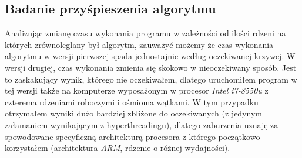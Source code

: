 \documentclass{article}
\begin{document}
    \subsection{Badanie przyśpieszenia algorytmu}
        Analizując zmianę czasu wykonania programu w zależności od ilości rdzeni na których zrównoleglany był algorytm, zauważyć możemy że czas wykonania algorytmu w wersji pierwszej spada jednostajnie według oczekiwanej krzywej. W wersji drugiej, czas  wykonania zmienia się skokowo w nieoczekiwany sposób. Jest to zaskakujący wynik, którego nie oczekiwałem, dlatego uruchomiłem program w tej wersji także na komputerze wyposażonym w procesor \textit{Intel i7-8550u} z czterema rdzeniami roboczymi i ośmioma wątkami. W tym przypadku otrzymałem wyniki dużo bardziej zbliżone do oczekiwanych (z jedynym załamaniem wynikającym z hyperthreadingu), dlatego zaburzenia uznaję za spowodowane specyficzną architekturą procesora z którego początkowo korzystałem (architektura \textit{ARM}, rdzenie o różnej wydajności). 
        
\end{document}
